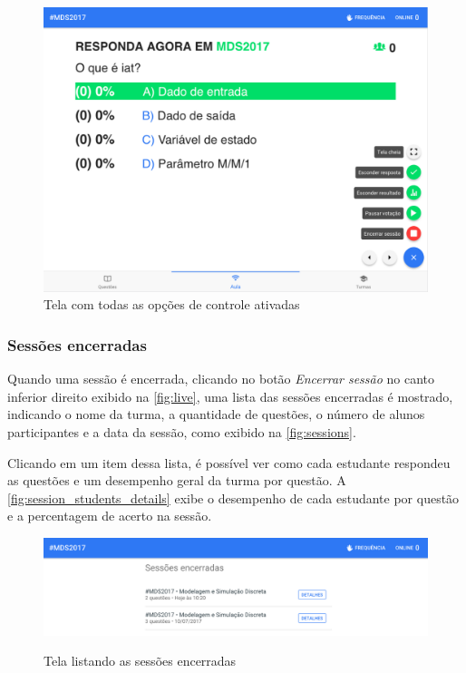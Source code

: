 \begin{figure}[!ht]
  \centering
  \caption{Tela com todas as opções de controle ativadas}
  \label{fig:live_answers}
  \includegraphics[scale=.35]{imagens/telas/live_answers}
  \doautor
\end{figure}

\clearpage

\subsubsection{Sessões encerradas}

Quando uma sessão é encerrada, clicando no botão \textit{Encerrar sessão} no canto inferior direito
exibido na \autoref{fig:live}, uma lista das sessões encerradas é mostrado, indicando
o nome da turma, a quantidade de questões, o número de alunos participantes e a data da sessão, como
exibido na \autoref{fig:sessions}.

Clicando em um item dessa lista, é possível ver como cada estudante respondeu as questões e um
desempenho geral da turma por questão. A \autoref{fig:session_students_details}  exibe o
desempenho de cada estudante por questão e a percentagem de acerto na sessão.

\begin{figure}[ht]
  \centering
  \caption{Tela listando as sessões encerradas}
  \includegraphics[scale=.42]{imagens/telas/sessions}
  \doautor
  \label{fig:sessions}
\end{figure}

